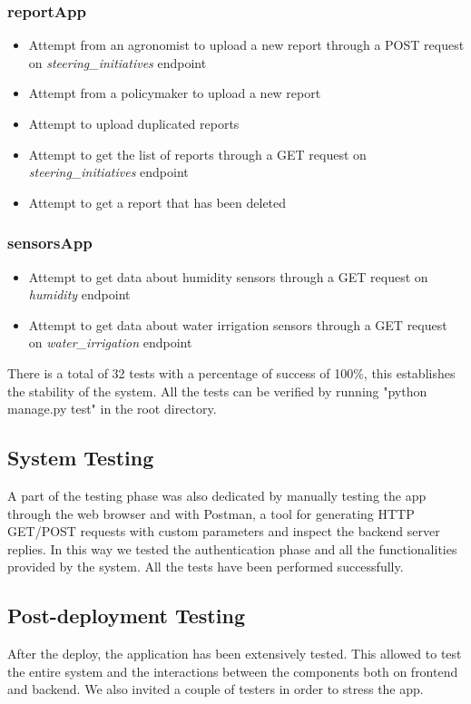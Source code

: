 \documentclass[table, 12pt]{article}
\begin{document}
\subsubsection*{reportApp}
\begin{itemize}
    \item Attempt from an agronomist to upload a new report through a POST request on \textit{steering\_initiatives} endpoint
    \item Attempt from a policymaker to upload a new report
    \item Attempt to upload duplicated reports
    \item Attempt to get the list of reports through a GET request on \textit{steering\_initiatives} endpoint
    \item Attempt to get a report that has been deleted
\end{itemize}
\subsubsection*{sensorsApp}
\begin{itemize}
    \item Attempt to get data about humidity sensors through a GET request on \textit{humidity} endpoint
    \item Attempt to get data about water irrigation sensors through a GET request on \textit{water\_irrigation} endpoint
\end{itemize}

There is a total of 32 tests with a percentage of success of 100\%, this establishes the stability of the system.
All the tests can be verified by running "python manage.py test" in the root directory.

\subsection{System Testing}
A part of the testing phase was also dedicated by manually testing the app through the web browser and with Postman, a tool for generating HTTP GET/POST requests with custom parameters and inspect the backend server replies.
In this way we tested the authentication phase and all the functionalities provided by the system.
All the tests have been performed successfully.

\subsection{Post-deployment Testing}
After the deploy, the application has been extensively tested. This allowed to test the entire system and the interactions between the components both on frontend and backend.
We also invited a couple of testers in order to stress the app.
\end{document}
